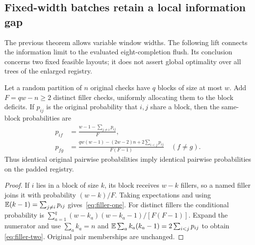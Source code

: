 \subsection{Fixed-width batches retain a local information gap}
The previous theorem allows variable window widths. The following lift
connects the information limit to the evaluated eight-completion flush.
Its conclusion concerns two fixed feasible layouts; it does not assert
global optimality over all trees of the enlarged registry.

\begin{lemma}\label{lem:padding}
Let a random partition of $n$ original checks have $q$ blocks of size at
most $w$. Add $F=qw-n\ge2$ distinct filler checks, uniformly allocating
them to the block deficits. If $p_{ij}$ is the original probability that
$i,j$ share a block, then the same-block probabilities are
\begin{align}
 p_{if}&=\frac{w-1-\sum_{j\ne i}p_{ij}}{F},\label{eq:filler-one}\\
 p_{fg}&=\frac{qw(w-1)-(2w-2)n+2\sum_{i<j}p_{ij}}{F(F-1)}
 \quad(f\ne g).\label{eq:filler-two}
\end{align}
Thus identical original pairwise probabilities imply identical pairwise
probabilities on the padded registry.
\end{lemma}
\begin{proof}
If $i$ lies in a block of size $k$, its block receives $w-k$ fillers,
so a named filler joins it with probability $(w-k)/F$.
Taking expectations and using
$\mathbb E(k-1)=\sum_{j\ne i}p_{ij}$ gives~\eqref{eq:filler-one}.
For distinct fillers the conditional probability is
$\sum_{a=1}^q(w-k_a)(w-k_a-1)/[F(F-1)]$.
Expand the numerator and use $\sum_a k_a=n$ and
$\mathbb E\sum_a k_a(k_a-1)=2\sum_{i<j}p_{ij}$ to obtain
\eqref{eq:filler-two}. Original pair memberships are unchanged.
\end{proof}


